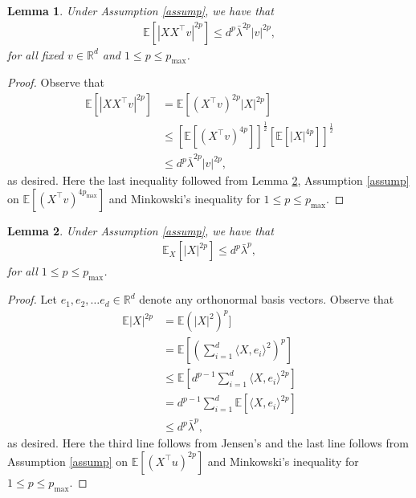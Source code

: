 \documentclass[11pt, reqno,english]{amsart}
\newtheorem{lemma}{Lemma}[section]
\begin{document}
\begin{lemma}\label{momenthelper2}
Under Assumption \ref{assump}, we have that
\begin{align*}
\mathbb{E}[|XX^\top v|^{2p}] \leq d^p\bar{\lambda}^{2p} |v|^{2p},
\end{align*}
for all fixed $v \in \mathbb{R}^d$ and $1 \leq p \leq p_{\max}$. 
\end{lemma}
\begin{proof}
Observe that
\begin{align*}
\mathbb{E}[|XX^\top v|^{2p}] &= \mathbb{E}[(X^\top v)^{2p} |X|^{2p}]
\\
&\leq [\mathbb{E}[(X^\top v)^{4p}]]^{\frac{1}{2}}[\mathbb{E}[|X|^{4p}]]^{\frac{1}{2}}
\\
&\leq d^p \bar{\lambda}^{2p} |v|^{2p},
\end{align*}
as desired. Here the last inequality followed from Lemma \ref{momenthelper4}, Assumption \ref{assump} on $\mathbb{E}[(X^\top v)^{4p_{\max}}]$ and Minkowski's inequality for $1 \leq p \leq p_{\max}$. 
\end{proof}

\begin{lemma}\label{momenthelper4}
Under Assumption \ref{assump}, we have that
\begin{align*}
\mathbb{E}_X[|X|^{2p}] \leq d^p \bar{\lambda}^p,
\end{align*}
for all $1 \leq p \leq p_{\max}$. 
\end{lemma}
\begin{proof}
Let $e_1, e_2, \dots e_d \in \mathbb{R}^d$ denote any orthonormal basis vectors. Observe that 
\begin{align*}
\mathbb{E}|X|^{2p} &= \mathbb{E}(|X|^2)^p]
\\
&= \mathbb{E}[(\sum_{i = 1}^d \langle X, e_i \rangle^2)^p]
\\
&\leq \mathbb{E}[d^{p-1}\sum_{i = 1}^d \langle X, e_i \rangle^{2p}]
\\
&= d^{p-1}\sum_{i = 1}^d \mathbb{E}[\langle X, e_i \rangle^{2p}]
\\
&\leq d^p \bar{\lambda}^p,
\end{align*}
as desired. Here the third line follows from Jensen's and the last line follows from Assumption \ref{assump} on $\mathbb{E}[(X^\top u)^{2p}]$ and Minkowski's inequality for $1 \leq p \leq p_{\max}$.
\end{proof}
\end{document}
